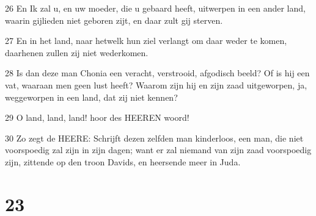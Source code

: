 \par 26 En Ik zal u, en uw moeder, die u gebaard heeft, uitwerpen in een ander land, waarin gijlieden niet geboren zijt, en daar zult gij sterven.
\par 27 En in het land, naar hetwelk hun ziel verlangt om daar weder te komen, daarhenen zullen zij niet wederkomen.
\par 28 Is dan deze man Chonia een veracht, verstrooid, afgodisch beeld? Of is hij een vat, waaraan men geen lust heeft? Waarom zijn hij en zijn zaad uitgeworpen, ja, weggeworpen in een land, dat zij niet kennen?
\par 29 O land, land, land! hoor des HEEREN woord!
\par 30 Zo zegt de HEERE: Schrijft dezen zelfden man kinderloos, een man, die niet voorspoedig zal zijn in zijn dagen; want er zal niemand van zijn zaad voorspoedig zijn, zittende op den troon Davids, en heersende meer in Juda.

\chapter{23}

